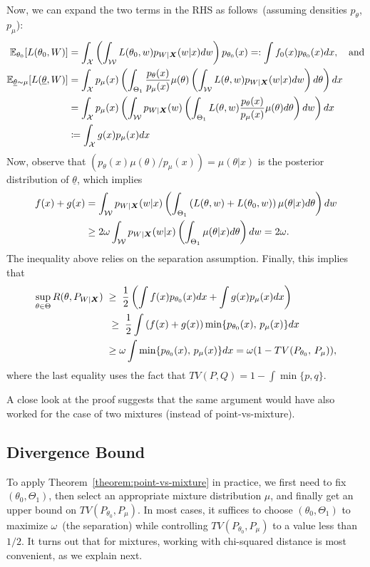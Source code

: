 \documentclass[12pt]{article}
\begin{document}
Now, we can expand the two terms in the RHS as follows~(assuming densities $p_\theta$, $p_\mu$): 
\begin{align}
\mathbb{E}_{\theta_0} [L(\theta_0, W)] &= \int_{{\cal X}} \left( \int_{{\cal W}} L(\theta_0, w) p_{W|{\boldsymbol X}}(w|x) dw \right) p_{\theta_0}(x) =: \int f_0(x) p_{\theta_0}(x) dx, \quad \text{and} \\
\mathbb{E}_{\underline{\theta} \sim\mu}[L(\underline{\theta}, W)] &= \int_{{\cal X}} p_{\mu}(x) \left( \int_{\Theta_1} \frac{p_{\theta}(x)}{p_\mu(x)} \mu(\theta) \left( \int_{{\cal W}} L(\theta, w) p_{W|{\boldsymbol X}}(w|x)dw \right) d\theta \right) dx \\
&= \int_{{\cal X}} p_{\mu}(x) \left( \int_{{\cal W}} p_{W|{\boldsymbol X}}(w)  \left( \int_{\Theta_1} L(\theta, w) \frac{p_{\theta}(x)}{p_\mu(x)} \mu(\theta) d\theta \right) dw \right) dx \\
& \coloneqq \int_{{\cal X}} g(x) p_{\mu}(x) dx
\end{align}
Now, observe that $(p_\theta(x) \mu(\theta)/p_\mu(x)) = \mu(\theta|x)$ is the posterior distribution of $\underline{\theta}$, which implies  
\begin{align}
f(x) + g(x) &= \int_{{\cal W}} p_{W|{\boldsymbol X}}(w|x) \left(  \int_{\Theta_1} \left( L(\theta, w) + L(\theta_0, w)  \right) \mu(\theta|x) d\theta  \right) dw \\
& \geq 2\omega \int_{{\cal W}} p_{W|{\boldsymbol X}}(w|x) \left( \int_{\Theta_1} \mu(\theta|x) d\theta \right) dw = 2\omega. 
\end{align}
The inequality above relies on the separation assumption. Finally, this implies that 
\begin{align}
\sup_{\theta \in \Theta} R(\theta, P_{W|{\boldsymbol X}}) \; &\geq \; \frac{1}{2}\left(  \int f(x) p_{\theta_0}(x) dx + \int g(x) p_{\mu}(x) dx \right) \\
& \; \geq\; \frac 1 2 \int \left( f(x) + g(x) \right)  \min\{ p_{\theta_0}(x), \, p_{\mu}(x) \} dx \\
& \geq  \omega \int \min \{ p_{\theta_0}(x), \, p_{\mu}(x) \} dx = \omega (1-TV(P_{\theta_0}, \, P_{\mu})), 
\end{align}
where the last equality uses the fact that $TV(P, Q) = 1 - \int \min\{p, q\}$. 
\hfill \qedsymbol
\begin{remark}
	\label{remark:extension-to-two-mixtures} A close look at the proof suggests that the same argument would have also worked for the case of two mixtures (instead of point-vs-mixture). 
\end{remark}


\subsection{Divergence Bound}
\label{subsec:divergence-bound}
	To apply Theorem~\ref{theorem:point-vs-mixture} in practice, we first need to fix $(\theta_0, \Theta_1)$, then select an appropriate mixture distribution $\mu$, and finally get an upper bound on $TV(P_{\theta_0}, P_\mu)$. In most cases, it suffices to choose $(\theta_0, \Theta_1)$ to maximize $\omega$~(the separation) while controlling $TV(P_{\theta_0}, P_\mu)$ to a value less than $1/2$. It turns out that for mixtures, working with chi-squared distance is most convenient, as we explain next. 
\end{document}
